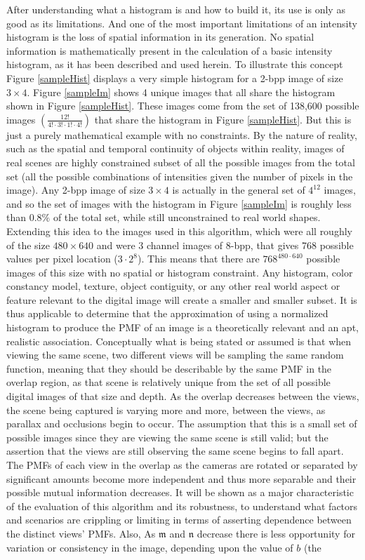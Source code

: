 After understanding what a histogram is and how to build it, its use is only as good as its limitations. And one of the most important limitations of an intensity histogram is the loss of spatial information in its generation. No spatial information is mathematically present in the calculation of a basic intensity histogram, as it has been described and used herein. To illustrate this concept Figure \ref{sampleHist} displays a very simple histogram for a 2-bpp image of size $3\times4$. Figure \ref{sampleIm} shows 4 unique images that all share the histogram shown in Figure \ref{sampleHist}. These images come from the set of 138,600 possible images $\left(\frac{12!}{4!\cdot3!\cdot1!\cdot4!}\right)$ that share the histogram in Figure \ref{sampleHist}. But this is just a purely mathematical example with no constraints. By the nature of reality, such as the spatial and temporal continuity of objects within reality, images of real scenes are highly constrained subset of all the possible images from the total set (all the possible combinations of intensities given the number of pixels in the image). Any 2-bpp image of size $3\times4$ is actually in the general set of $4^{12}$ images, and so the set of images with the histogram in Figure \ref{sampleIm} is roughly less than $0.8\%$ of the total set, while still unconstrained to real world shapes. Extending this idea to the images used in this algorithm, which were all roughly of the size $480 \times 640$ and were 3 channel images of 8-bpp, that gives 768 possible values per pixel location ($3\cdot2^{8}$). This means that there are $768^{480\cdot640}$ possible images of this size with no spatial or histogram constraint. Any histogram, color constancy model, texture, object contiguity, or any other real world aspect or feature relevant to the digital image will create a smaller and smaller subset. It is thus applicable to determine that the approximation of using a normalized histogram to produce the PMF of an image is a theoretically relevant and an apt, realistic association. Conceptually what is being stated or assumed is that when viewing the same scene, two different views will be sampling the same random function, meaning that they should be describable by the same PMF in the overlap region, as that scene is relatively unique from the set of all possible digital images of that size and depth. As the overlap decreases between the views, the scene being captured is varying more and more, between the views, as parallax and occlusions begin to occur. The assumption that this is a small set of possible images since they are viewing the same scene is still valid; but the assertion that the views are still observing the same scene begins to fall apart. The PMFs of each view in the overlap as the cameras are rotated or separated by significant amounts become more independent and thus more separable and their possible mutual information decreases. It will be shown as a major characteristic of the evaluation of this algorithm and its robustness, to understand what factors and scenarios are crippling or limiting in terms of asserting dependence between the distinct views' PMFs. Also, As $\mathfrak{m}$ and $\mathfrak{n}$ decrease there is less opportunity for variation or consistency in the image, depending upon the value of $b$ (the 